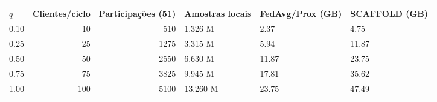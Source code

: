 \begin{tabular}{lrrlll}
\toprule
$q$ & Clientes/ciclo & Participações (51) & Amostras locais & FedAvg/Prox (GB) & SCAFFOLD (GB) \\
\midrule
0.10 & 10 & 510 & 1.326 M & 2.37 & 4.75 \\
0.25 & 25 & 1275 & 3.315 M & 5.94 & 11.87 \\
0.50 & 50 & 2550 & 6.630 M & 11.87 & 23.75 \\
0.75 & 75 & 3825 & 9.945 M & 17.81 & 35.62 \\
1.00 & 100 & 5100 & 13.260 M & 23.75 & 47.49 \\
\bottomrule
\end{tabular}
